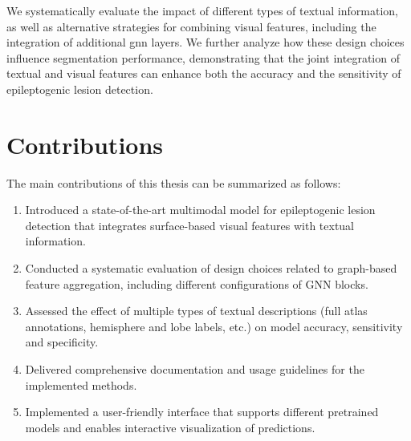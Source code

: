 \documentclass[FCD_GNN.tex]{subfiles}
\begin{document}
We systematically evaluate the impact of different types of textual information, as well as alternative strategies 
for combining visual features, including the integration of additional \ac{gnn} layers. 
We further analyze how these design choices influence segmentation performance, 
demonstrating that the joint integration of textual and visual features can enhance both the accuracy and the sensitivity of epileptogenic lesion detection.

\section{Contributions}

The main contributions of this thesis can be summarized as follows:

\begin{enumerate}    
    \item Introduced a state-of-the-art multimodal model for epileptogenic lesion detection that integrates surface-based visual features with textual information.
    \item Conducted a systematic evaluation of design choices related to graph-based feature aggregation, including different configurations of GNN blocks.
    \item Assessed the effect of multiple types of textual descriptions (full atlas annotations, hemisphere and lobe labels, etc.) on model accuracy, sensitivity and specificity.
    \item Delivered comprehensive documentation and usage guidelines for the implemented methods.
    \item Implemented a user-friendly interface that supports different pretrained models and enables interactive visualization of predictions.
\end{enumerate}
\end{document}
